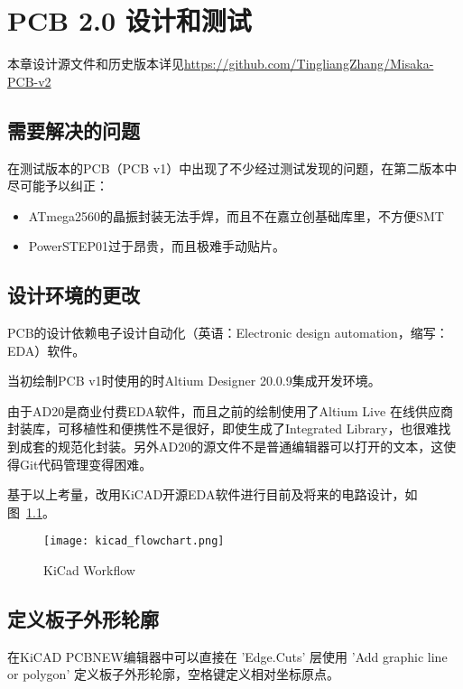 \chapter{PCB 2.0 设计和测试}
\label{cha:PCB-v2}

本章设计源文件和历史版本详见\url{https://github.com/TingliangZhang/Misaka-PCB-v2}

\section{需要解决的问题}

在测试版本的PCB（PCB v1）中出现了不少经过测试发现的问题，在第二版本中尽可能予以纠正：

\begin{itemize}
    \item ATmega2560的晶振封装无法手焊，而且不在嘉立创基础库里，不方便SMT
    \item PowerSTEP01过于昂贵，而且极难手动贴片。
\end{itemize}

\section{设计环境的更改}

PCB的设计依赖电子设计自动化（英语：Electronic design automation，缩写：EDA）软件。

当初绘制PCB v1时使用的时Altium Designer 20.0.9集成开发环境。

由于AD20是商业付费EDA软件，而且之前的绘制使用了Altium Live 在线供应商封装库，可移植性和便携性不是很好，即使生成了Integrated Library，也很难找到成套的规范化封装。另外AD20的源文件不是普通编辑器可以打开的文本，这使得Git代码管理变得困难。

基于以上考量，改用KiCAD开源EDA软件进行目前及将来的电路设计，如图~\ref{fig:kicad_flowchart}。

\begin{figure}[htbp]
    \centering
    \texttt{[image: kicad\_flowchart.png]}
    \caption{KiCad Workflow}
    \label{fig:kicad_flowchart}
\end{figure}

\section{定义板子外形轮廓}

在KiCAD PCBNEW编辑器中可以直接在 'Edge.Cuts' 层使用 'Add graphic line or polygon' 定义板子外形轮廓，空格键定义相对坐标原点。

